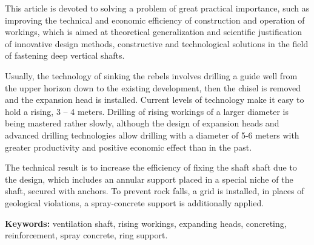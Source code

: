 This article is devoted to solving a problem of great practical
importance, such as improving the technical and economic efficiency of
construction and operation of workings, which is aimed at theoretical
generalization and scientific justification of innovative design
methods, constructive and technological solutions in the field of
fastening deep vertical shafts.

Usually, the technology of sinking the rebels involves drilling a guide
well from the upper horizon down to the existing development, then the
chisel is removed and the expansion head is installed. Current levels of
technology make it easy to hold a rising, 3 -- 4 meters. Drilling of
rising workings of a larger diameter is being mastered rather slowly,
although the design of expansion heads and advanced drilling
technologies allow drilling with a diameter of 5-6 meters with greater
productivity and positive economic effect than in the past.

The technical result is to increase the efficiency of fixing the shaft
shaft due to the design, which includes an annular support placed in a
special niche of the shaft, secured with anchors. To prevent rock falls,
a grid is installed, in places of geological violations, a
spray-concrete support is additionally applied.

{\bfseries Keywords:} ventilation shaft, rising workings, expanding heads,
concreting, reinforcement, spray concrete, ring support.

